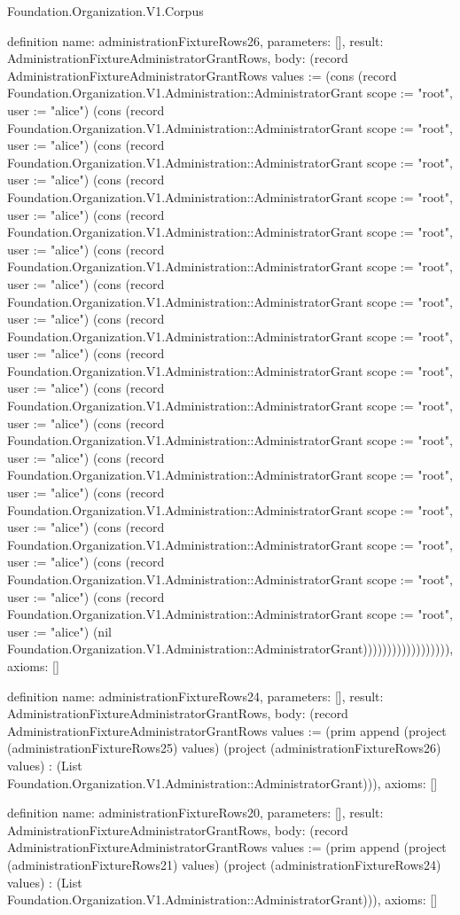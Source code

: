 \begin{lexlean}{Foundation.Organization.V1.Corpus}
\begin{semanticmodule}
definition{
  name: administrationFixtureRows26,
  parameters: [],
  result: AdministrationFixtureAdministratorGrantRows,
  body: (record AdministrationFixtureAdministratorGrantRows {values := (cons (record Foundation.Organization.V1.Administration::AdministratorGrant {scope := "root", user := "alice"}) (cons (record Foundation.Organization.V1.Administration::AdministratorGrant {scope := "root", user := "alice"}) (cons (record Foundation.Organization.V1.Administration::AdministratorGrant {scope := "root", user := "alice"}) (cons (record Foundation.Organization.V1.Administration::AdministratorGrant {scope := "root", user := "alice"}) (cons (record Foundation.Organization.V1.Administration::AdministratorGrant {scope := "root", user := "alice"}) (cons (record Foundation.Organization.V1.Administration::AdministratorGrant {scope := "root", user := "alice"}) (cons (record Foundation.Organization.V1.Administration::AdministratorGrant {scope := "root", user := "alice"}) (cons (record Foundation.Organization.V1.Administration::AdministratorGrant {scope := "root", user := "alice"}) (cons (record Foundation.Organization.V1.Administration::AdministratorGrant {scope := "root", user := "alice"}) (cons (record Foundation.Organization.V1.Administration::AdministratorGrant {scope := "root", user := "alice"}) (cons (record Foundation.Organization.V1.Administration::AdministratorGrant {scope := "root", user := "alice"}) (cons (record Foundation.Organization.V1.Administration::AdministratorGrant {scope := "root", user := "alice"}) (cons (record Foundation.Organization.V1.Administration::AdministratorGrant {scope := "root", user := "alice"}) (cons (record Foundation.Organization.V1.Administration::AdministratorGrant {scope := "root", user := "alice"}) (cons (record Foundation.Organization.V1.Administration::AdministratorGrant {scope := "root", user := "alice"}) (cons (record Foundation.Organization.V1.Administration::AdministratorGrant {scope := "root", user := "alice"}) (nil Foundation.Organization.V1.Administration::AdministratorGrant)))))))))))))))))}),
  axioms: []
}

definition{
  name: administrationFixtureRows24,
  parameters: [],
  result: AdministrationFixtureAdministratorGrantRows,
  body: (record AdministrationFixtureAdministratorGrantRows {values := (prim append (project (administrationFixtureRows25) values) (project (administrationFixtureRows26) values) : (List Foundation.Organization.V1.Administration::AdministratorGrant))}),
  axioms: []
}

definition{
  name: administrationFixtureRows20,
  parameters: [],
  result: AdministrationFixtureAdministratorGrantRows,
  body: (record AdministrationFixtureAdministratorGrantRows {values := (prim append (project (administrationFixtureRows21) values) (project (administrationFixtureRows24) values) : (List Foundation.Organization.V1.Administration::AdministratorGrant))}),
  axioms: []
}


\end{semanticmodule}
\end{lexlean}
